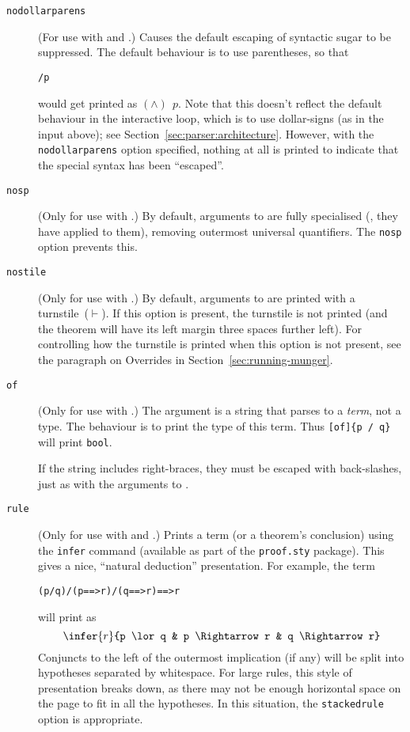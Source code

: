 \begin{description}
\item[\texttt{nodollarparens}] (For use with \holtm{} and \holthm.) Causes the default escaping of syntactic sugar to be suppressed.
%
%
The default behaviour is to use parentheses, so that
\begin{alltt}
   \holtm\lb\dol/\bs p\rb
\end{alltt}
would get printed as $(\land)\;\,p$.
Note that this doesn't reflect the default behaviour in the interactive loop, which is to use dollar-signs (as in the input above); see Section~\ref{sec:parser:architecture}.
However, with the \texttt{nodollarparens} option specified, nothing at all is printed to indicate that the special syntax has been ``escaped''.

\item[\texttt{nosp}] (Only for use with \holthm.)
%
By default, arguments to \holthm{} are fully specialised (\ie, they have  applied to them), removing outermost universal quantifiers.
%
The \texttt{nosp} option prevents this.

\item[\texttt{nostile}] (Only for use with \holthm.)
%
By default, arguments to \holthm{} are printed with a turnstile~($\vdash$).
%
If this option is present, the turnstile is not printed (and the theorem will have its left margin three spaces further left).
%
For controlling how the turnstile is printed when this option is not present, see the paragraph on Overrides in Section~\ref{sec:running-munger}.

\item[\texttt{of}] (Only for use with \holty.)
%
The argument is a string that parses to a \emph{term}, not a type.
%
The behaviour is to print the type of this term.
%
Thus \texttt{\holty{}[of]\{p /\bs{} q\}} will print \texttt{bool}.

If the string includes right-braces, they must be escaped with
back-slashes, just as with the arguments to \holtm.

\item[\texttt{rule}] (Only for use with \holtm{} and \holthm.)
Prints a term (or a theorem's conclusion) using the \texttt{\bs{}infer} command (available as part of the \texttt{proof.sty} package).
This gives a nice, ``natural deduction'' presentation.
For example, the term
\begin{alltt}
   (p \bs{}/ q) /\bs{} (p ==> r) /\bs{} (q ==> r) ==> r
\end{alltt}
will print as
\[
\infer{r}{p \lor q & p \Rightarrow r & q \Rightarrow r}
\]
Conjuncts to the left of the outermost implication (if any) will be split into hypotheses separated by whitespace.
For large rules, this style of presentation breaks down, as there may not be enough horizontal space on the page to fit in all the hypotheses.
In this situation, the \texttt{stackedrule} option is appropriate.


\end{description}
